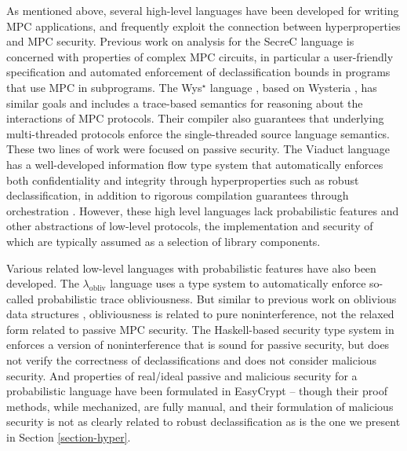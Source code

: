 
As mentioned above, several high-level languages have been developed
for writing MPC applications, and frequently exploit the connection
between hyperproperties and MPC security. Previous work on analysis
for the SecreC language
\cite{almeida2018enforcing,10.1145/2637113.2637119} is concerned with
properties of complex MPC circuits, in particular a user-friendly
specification and automated enforcement of declassification bounds in
programs that use MPC in subprograms. The Wys$^\star$ language
\cite{wysstar}, based on Wysteria \cite{rastogi2014wysteria}, has
similar goals and includes a trace-based semantics for reasoning about
the interactions of MPC protocols. Their compiler also guarantees that
underlying multi-threaded protocols enforce the single-threaded source
language semantics. These two lines of work were focused on passive
security. The Viaduct language
\cite{10.1145/3453483.3454074} has a well-developed
information flow type system that automatically enforces both
confidentiality and integrity through hyperproperties such as robust
declassification, in addition to rigorous compilation guarantees
through orchestration \cite{viaduct-UC}. However, these high level
languages lack probabilistic features and other abstractions of
low-level protocols, the implementation and security of which are
typically assumed as a selection of library components.

\compwrapfig

Various related low-level languages with probabilistic features have
also been developed. The $\lambda_{\mathrm{obliv}}$ language
\cite{darais2019language} uses a type system to automatically
enforce so-called probabilistic trace obliviousness.  But similar to
previous work on oblivious data structures \cite{10.1145/3498713},
obliviousness is related to pure noninterference, not the relaxed form
related to passive MPC security. The Haskell-based security type
system in \cite{6266151} enforces a version of noninterference that is
sound for passive security, but does not verify the correctness of
declassifications and does not consider malicious security. And
properties of real/ideal passive and malicious security for a
probabilistic language have been formulated in EasyCrypt
\cite{8429300}-- though their proof methods, while mechanized, are
fully manual, and their formulation of malicious security is not as
clearly related to robust declassification as is the one we present in
Section \ref{section-hyper}.

